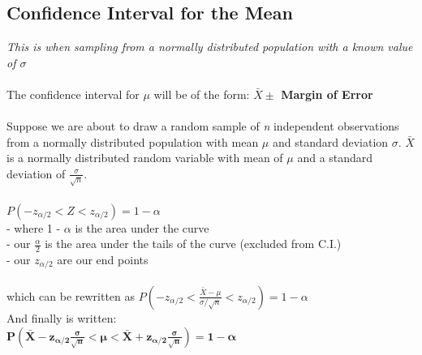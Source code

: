\documentclass[12pt, a4paper]{article}
\begin{document}
	\subsection{Confidence Interval for the Mean}
	\textit{This is when sampling from a normally distributed population with a known value of $\sigma$} \\~\\
	The confidence interval for $\mu$ will be of the form: \textbf{$\bar{X} \pm$ Margin of Error} \\~\\
	Suppose we are about to draw a random sample of \textit{n} independent observations from a normally distributed population with mean $\mu$ and standard deviation $\sigma$. $\bar{X}$ is a normally distributed random variable with mean of $\mu$ and a standard deviation of $\frac{\sigma}{\sqrt{n}}$. \\~\\
	$P(-z_{\alpha/2} < Z < z_{\alpha/2}) = 1 - \alpha$ \\
	- where 1 - $\alpha$ is the area under the curve \\
	- our $\frac{\alpha}{2}$ is the area under the tails of the curve (excluded from C.I.) \\
	- our $z_{\alpha/2}$ are our end points \\~\\
	which can be rewritten as $P(-z_{\alpha/2} < \frac{\bar{X} - \mu}{\sigma/\sqrt{n}} < z_{\alpha/2}) = 1 - \alpha$ \\
	And finally is written: \\
	\large $\mathbf{P(\bar{X} - z_{\alpha/2}\frac{\sigma}{\sqrt{n}} < \mu < \bar{X} + z_{\alpha/2}\frac{\sigma}{\sqrt{n}}) = 1 - \alpha}$ \normalsize \newpage
	
\end{document}
